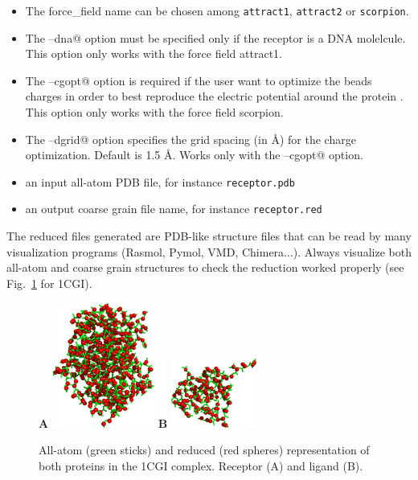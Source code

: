 \documentclass[12pt,a4paper]{article}
\begin{document}
\begin{itemize}
\item The force\_field name can be chosen among {\tt attract1}, {\tt attract2} or {\tt scorpion}.
\item The \verb@--dna@ option must be specified only if the receptor is a DNA molelcule. This option only works with the force field attract1.
\item The \verb@--cgopt@ option is required if the user want to optimize the beads charges in order to best reproduce the electric potential around the protein \cite{Basdevant2007}. This option only works with the force field scorpion.
\item The \verb@--dgrid@ option specifies the grid spacing (in \AA) for the charge optimization. Default is 1.5 \AA. Works only with the \verb@--cgopt@ option.
\item an input all-atom PDB file, for instance {\tt receptor.pdb}
\item an output coarse grain file name, for instance {\tt receptor.red}
\end{itemize}

The reduced files generated are PDB-like structure files that can be read by many visualization programs (Rasmol, Pymol, VMD, Chimera...). Always visualize both all-atom and coarse grain structures to check the reduction worked properly (see Fig.~\ref{1CGI_at_cg} for 1CGI).

\begin{figure}[htbp]
\center
{\textbf A}
\includegraphics*[width=0.30\textwidth]{img/1CGI_receptor.png}
\hspace*{2cm}
{\textbf B}
\includegraphics*[width=0.25\textwidth]{img/1CGI_ligand.png}
\caption{All-atom (green sticks) and reduced (red spheres) representation of 
both proteins in the 1CGI complex. Receptor (A) and ligand (B).}
\label{1CGI_at_cg}
\end{figure}
\end{document}
